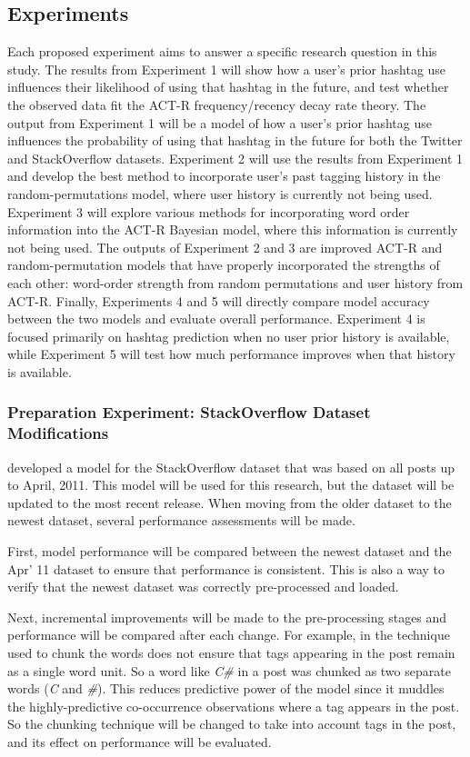 \documentclass[man,floatsintext,donotrepeattitle]{apa6}
\begin{document}
\subsection{Experiments}

Each proposed experiment aims to answer a specific research question in this study.
The results from Experiment 1 will show how a user's prior hashtag use influences their likelihood of using that hashtag in the future, and test whether the observed data fit the ACT-R frequency/recency decay rate theory.
The output from Experiment 1 will be a model of how a user's prior hashtag use influences the probability of using that hashtag in the future for both the Twitter and StackOverflow datasets.
Experiment 2 will use the results from Experiment 1 and develop the best method to incorporate user's past tagging history in the random-permutations model, where user history is currently not being used.
Experiment 3 will explore various methods for incorporating word order information into the ACT-R Bayesian model, where this information is currently not being used.
The outputs of Experiment 2 and 3 are improved ACT-R and random-permutation models that have properly incorporated the strengths of each other: word-order strength from random permutations and user history from ACT-R.
Finally, Experiments 4 and 5 will directly compare model accuracy between the two models and evaluate overall performance.
Experiment 4 is focused primarily on hashtag prediction when no user prior history is available, while Experiment 5 will test how much performance improves when that history is available.

\subsubsection{Preparation Experiment: StackOverflow Dataset Modifications}

\textcite{Stanley2013} developed a model for the StackOverflow dataset that was based on all posts up to April, 2011.
This model will be used for this research, but the dataset will be updated to the most recent release.
When moving from the older dataset to the newest dataset, several performance assessments will be made.

First, model performance will be compared between the newest dataset and the Apr' 11 dataset to ensure that performance is consistent.
This is also a way to verify that the newest dataset was correctly pre-processed and loaded.

Next, incremental improvements will be made to the pre-processing stages and performance will be compared after each change.
For example, in \textcite{Stanley2013} the technique used to chunk the words does not ensure that tags appearing in the post remain as a single word unit.
So a word like \emph{C\#} in a post was chunked as two separate words (\emph{C} and \emph{\#}).
This reduces predictive power of the model since it muddles the highly-predictive co-occurrence observations where a tag appears in the post.
So the chunking technique will be changed to take into account tags in the post, and its effect on performance will be evaluated.
\end{document}
